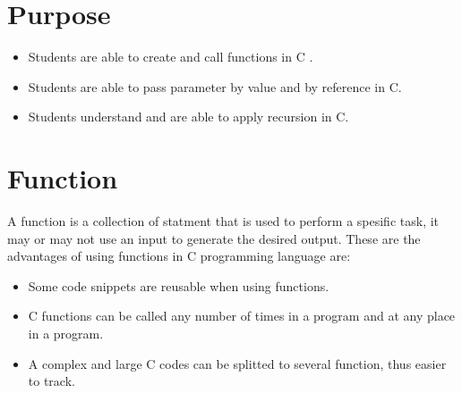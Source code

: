 \section{Purpose}
\begin{itemize}[label=$\bullet$, itemsep=-1pt, leftmargin=*]
    \item Students are able to create and call functions in C .
    \item Students are able to pass parameter by value and by reference in C.
    \item Students understand and are able to apply recursion in C. 
    
\end{itemize}

\section{Function}
A function is a collection of statment that is used to perform a spesific task, it may or may not use an input to generate the desired output.
These are the advantages of using functions in C programming language are:
\begin{itemize}
	\item Some code snippets are reusable when using functions. 
    \item C functions can be called any number of times in a program and at any place in a program.
    \item A complex and large C codes can be splitted to several function, thus easier to track.
\end{itemize}
